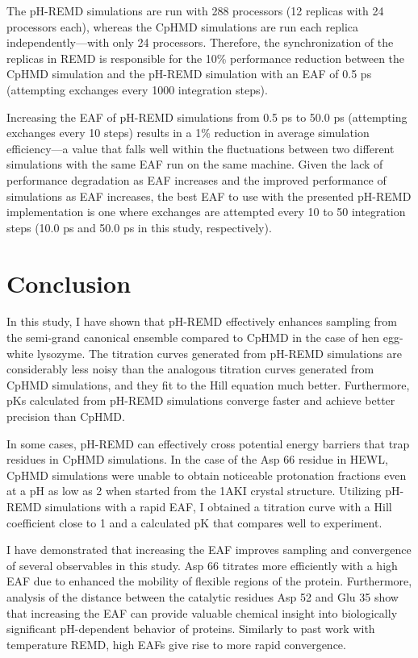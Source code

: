 The pH-REMD simulations are run with 288 processors (12 replicas with 24
processors each), whereas the CpHMD simulations are run each replica
independently---with only 24 processors.  Therefore, the synchronization of the
replicas in REMD is responsible for the 10\% performance reduction between the
CpHMD simulation and the pH-REMD simulation with an EAF of 0.5 ps
(attempting exchanges every 1000 integration steps).

Increasing the EAF of pH-REMD simulations from 0.5 ps to 50.0
ps (attempting exchanges every 10 steps) results in a 1\% reduction in
average simulation efficiency---a value that falls well within the fluctuations
between two different simulations with the same EAF run on the same machine.
Given the lack of performance degradation as EAF increases and the improved
performance of simulations as EAF increases, the best EAF to use with the
presented pH-REMD implementation is one where exchanges are attempted every 10
to 50 integration steps (10.0 ps and 50.0 ps in this study,
respectively).

\section{Conclusion}

In this study, I have shown that pH-REMD effectively enhances sampling from the
semi-grand canonical ensemble compared to CpHMD in the case of hen egg-white
lysozyme.  The titration curves generated from pH-REMD simulations are
considerably less noisy than the analogous titration curves generated from CpHMD
simulations, and they fit to the Hill equation much better.  Furthermore,
pKs calculated from pH-REMD simulations converge faster and achieve
better precision than CpHMD.

In some cases, pH-REMD can effectively cross potential energy barriers that trap
residues in CpHMD simulations.  In the case of the Asp 66 residue in HEWL, CpHMD
simulations were unable to obtain noticeable protonation fractions even at a pH
as low as 2 when started from the 1AKI crystal structure.  Utilizing pH-REMD
simulations with a rapid EAF, I obtained a titration curve with a Hill
coefficient close to 1 and a calculated pK that compares well to
experiment.

I have demonstrated that increasing the EAF improves sampling and convergence
of several observables in this study.  Asp 66 titrates more efficiently with a
high EAF due to enhanced the mobility of flexible regions of the protein.
Furthermore, analysis of the distance between the catalytic residues Asp 52 and
Glu 35 show that increasing the EAF can provide valuable chemical insight into
biologically significant pH-dependent behavior of proteins.  Similarly to past
work with temperature REMD, \cite{Sindhikara2008,Sindhikara2010} high EAFs give
rise to more rapid convergence.

